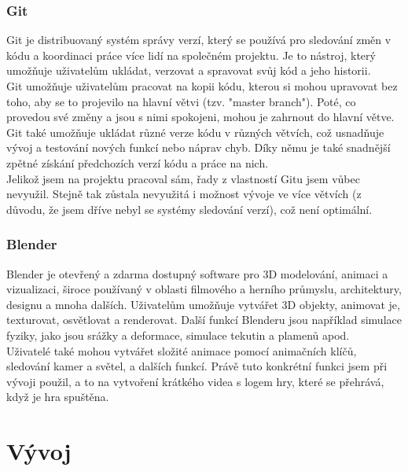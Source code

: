 \documentclass[12pt,a4paper,hidelinks]{article}
\begin{document}
\subsubsection{Git}
Git je distribuovaný systém správy verzí, který se používá pro sledování změn v kódu a koordinaci práce více lidí na společném projektu. Je to nástroj, který umožňuje uživatelům ukládat, verzovat a spravovat svůj kód a jeho historii.\\
Git umožňuje uživatelům pracovat na kopii kódu, kterou si mohou upravovat bez toho, aby se to projevilo na hlavní větvi (tzv. "master branch"). Poté, co provedou své změny a jsou s nimi spokojeni, mohou je zahrnout do hlavní větve. Git také umožňuje ukládat různé verze kódu v různých větvích, což usnadňuje vývoj a testování nových funkcí nebo náprav chyb. Díky němu je také snadnější zpětné získání předchozích verzí kódu a práce na nich.\\
Jelikož jsem na projektu pracoval sám, řady z vlastností Gitu jsem vůbec nevyužil. Stejně tak zůstala nevyužitá i možnost vývoje ve více větvích (z důvodu, že jsem dříve nebyl se systémy sledování verzí), což není optimální.\\
\subsubsection{Blender}
Blender je otevřený a zdarma dostupný software pro 3D modelování, animaci a vizualizaci, široce používaný v oblasti filmového a herního průmyslu, architektury, designu a mnoha dalších. Uživatelům umožňuje vytvářet 3D objekty, animovat je, texturovat, osvětlovat a renderovat. Další funkcí Blenderu jsou například simulace fyziky, jako jsou srážky a deformace, simulace tekutin a plamenů apod.\\
Uživatelé také mohou vytvářet složité animace pomocí animačních klíčů, sledování kamer a světel, a dalších funkcí. Právě tuto konkrétní funkci jsem při vývoji použil, a to na vytvoření krátkého videa s logem hry, které se přehrává, když je hra spuštěna.\\


\clearpage

\section{Vývoj}
\end{document}
